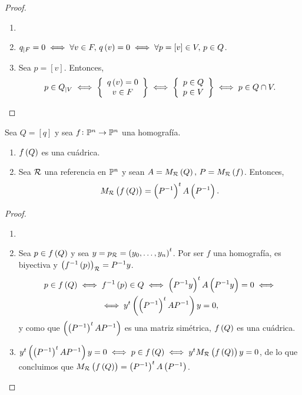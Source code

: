 \begin{proof}
\begin{enumerate}[(1)] \item[]
    \item $q_{|F} = 0 \iff \forall v \in F, \, q \left( v \right) = 0 \iff \forall p = \left[ v \right] \in V, \, p \in Q$.
    \item Sea $p=\left[ v \right]$. Entonces, 
      \[
        p \in Q_{|V} \iff \left\{ \begin{array}{c} q \left( v \right) = 0 \\ v \in F \end{array} \right\} \iff \left\{ \begin{array}{c} p \in Q \\ p \in V \end{array} \right\} \iff p \in Q\cap V.
      \]
  \end{enumerate}    
\end{proof}

\begin{prop}
  Sea $Q=\left[q \right]$ y sea $f \colon \mathbb{P}^n \to \mathbb{P}^n$ una homografía.
  \begin{enumerate}[(1)]
    \item $f\left( Q \right)$ es una cuádrica.
    \item Sea $\mathcal{R}$ una referencia en $\mathbb{P}^n$ y sean $A=M_{\mathcal{R}} \left( Q \right), \, P=M_{\mathcal{R}} \left( f \right)$. Entonces,
      \[
        M_{\mathcal{R}} \left( f \left( Q \right) \right) = \left( P^{-1} \right) ^t A \left( P^{-1} \right).
      \]
  \end{enumerate}
\end{prop}

\begin{proof}
\begin{enumerate}[(1)] \item[]
    \item Sea $p \in f \left( Q \right)$ y sea $y=p_{\mathcal{R}} = \left( y_0 , \dots , y_n \right) ^t$. Por ser $f$ una homografía, es biyectiva y $\left( f ^{-1} \left( p \right) \right) _{\mathcal{R}} = P^{-1} y$.
      \begin{gather*}
        p \in f \left( Q \right) \iff f^{-1} \left( p \right) \in Q \iff \left( P^{-1} y \right) ^t A \left( P^{-1} y \right) = 0 \iff \\
        \iff y^t \left( \left( P ^{-1} \right) ^t A P^{-1} \right) y = 0 ,
      \end{gather*}
      y como que $\left( \left( P ^{-1} \right) ^t A P^{-1} \right)$ es una matriz simétrica, $f \left( Q \right)$ es una cuádrica.
    \item $y^t \left( \left( P ^{-1} \right) ^t A P^{-1} \right) y = 0 \iff p \in f \left( Q \right) \iff y^t M_{\mathcal{R}} \left( f \left( Q \right) \right) y = 0$, de lo que concluimos que $M_{\mathcal{R}} \left( f \left( Q \right) \right) = \left( P^{-1} \right) ^t A \left( P^{-1} \right)$.
  \end{enumerate}
\end{proof}

